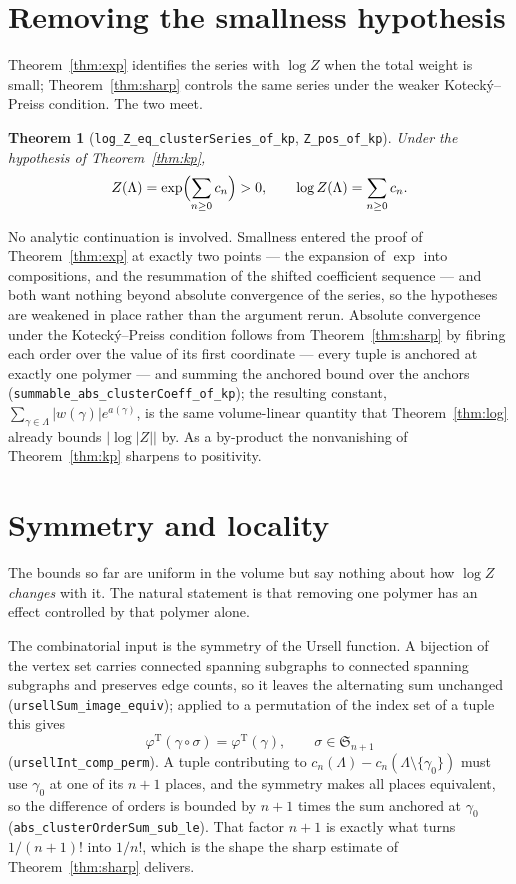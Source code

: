 \documentclass[11pt]{amsart}
\newtheorem{theorem}{Theorem}[section]
\begin{document}
\section{Removing the smallness hypothesis}\label{sec:kpexp}

Theorem~\ref{thm:exp} identifies the series with $\log Z$ when the total
weight is small; Theorem~\ref{thm:sharp} controls the same series under
the weaker Kotecký--Preiss condition. The two meet.

\begin{theorem}[\texttt{log\_Z\_eq\_clusterSeries\_of\_kp},
\texttt{Z\_pos\_of\_kp}]\label{thm:kpexp}
Under the hypothesis of Theorem~\ref{thm:kp},
\[
  Z(\Lambda) = \exp\Bigl(\sum_{n \ge 0} c_n\Bigr) > 0,
  \qquad
  \log Z(\Lambda) = \sum_{n \ge 0} c_n .
\]
\end{theorem}

No analytic continuation is involved. Smallness entered the proof of
Theorem~\ref{thm:exp} at exactly two points --- the expansion of $\exp$
into compositions, and the resummation of the shifted coefficient
sequence --- and both want nothing beyond absolute convergence of the
series, so the hypotheses are weakened in place rather than the argument
rerun. Absolute convergence under the Kotecký--Preiss condition follows
from Theorem~\ref{thm:sharp} by fibring each order over the value of its
first coordinate --- every tuple is anchored at exactly one polymer ---
and summing the anchored bound over the anchors
(\texttt{summable\_abs\_clusterCoeff\_of\_kp}); the resulting constant,
$\sum_{\gamma \in \Lambda} \lvert w(\gamma)\rvert e^{a(\gamma)}$, is the
same volume-linear quantity that Theorem~\ref{thm:log} already bounds
$\lvert \log \lvert Z\rvert \rvert$ by. As a by-product the
nonvanishing of Theorem~\ref{thm:kp} sharpens to positivity.

\section{Symmetry and locality}\label{sec:local}

The bounds so far are uniform in the volume but say nothing about how
$\log Z$ \emph{changes} with it. The natural statement is that removing
one polymer has an effect controlled by that polymer alone.

The combinatorial input is the symmetry of the Ursell function. A
bijection of the vertex set carries connected spanning subgraphs to
connected spanning subgraphs and preserves edge counts, so it leaves the
alternating sum unchanged (\texttt{ursellSum\_image\_equiv}); applied to
a permutation of the index set of a tuple this gives
\[
  \varphi^{\mathrm T}(\gamma \circ \sigma) = \varphi^{\mathrm T}(\gamma),
  \qquad \sigma \in \mathfrak S_{n+1}
\]
(\texttt{ursellInt\_comp\_perm}). A tuple contributing to
$c_n(\Lambda) - c_n(\Lambda \setminus \{\gamma_0\})$ must use $\gamma_0$
at one of its $n+1$ places, and the symmetry makes all places
equivalent, so the difference of orders is bounded by $n+1$ times the
sum anchored at $\gamma_0$ (\texttt{abs\_clusterOrderSum\_sub\_le}).
That factor $n+1$ is exactly what turns $1/(n+1)!$ into $1/n!$, which is
the shape the sharp estimate of Theorem~\ref{thm:sharp} delivers.
\end{document}
